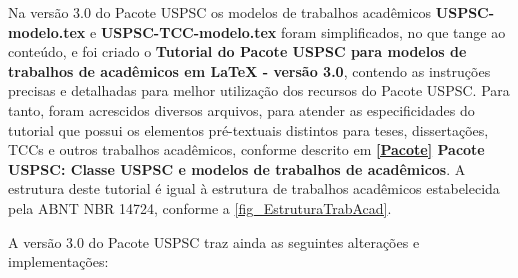 Na versão 3.0 do Pacote USPSC os modelos de trabalhos acadêmicos \textbf{USPSC-modelo.tex} e \textbf{USPSC-TCC-modelo.tex} foram simplificados, no que tange ao conteúdo, e foi criado o \textbf{Tutorial do Pacote USPSC para modelos de trabalhos de acad\^emicos em LaTeX - vers\~ao 3.0}, contendo as instruções precisas e detalhadas para melhor utilização dos recursos do Pacote USPSC. Para tanto, foram acrescidos diversos arquivos, para atender as especificidades do tutorial que possui os elementos pré-textuais distintos para teses, dissertações, TCCs e outros trabalhos acadêmicos, conforme descrito em  \textbf{\ref{Pacote} Pacote USPSC: Classe USPSC e modelos de trabalhos de acadêmicos}. A estrutura deste tutorial é igual à  estrutura de trabalhos acadêmicos estabelecida pela ABNT NBR 14724, conforme a \autoref{fig_EstruturaTrabAcad}.		

A versão 3.0 do Pacote USPSC traz ainda as seguintes alterações e implementações:

